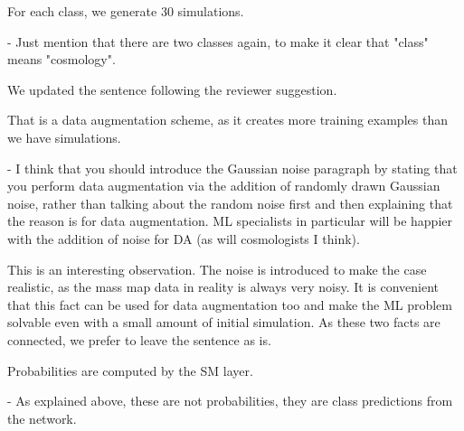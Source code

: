 \documentclass[12pt,a4paper]{article}
\newcommand{\nati}[1]{{\color[rgb]{.1,.6,.1}{NP: #1}}}
\newcommand{\TK}[1]{{\color{red}{TK: #1}}}
\newcommand{\todo}[1]{{\color[rgb]{.6,.1,.6}{TODO: #1}}}
\newcommand{\1}{\b{1}}              %
\newcommand{\0}{\b{0}}              %
\begin{document}
\begin{mdframed}[style=comment]
For each class, we generate 30 simulations.

- Just mention that there are two classes again, to make it clear that "class" means "cosmology".
\end{mdframed}
We updated the sentence following the reviewer suggestion.
\nati{@Tomek, do you think it is fine that we do not say that class==comoslogy? It think so.}

\begin{mdframed}[style=comment]
That is a data augmentation scheme, as it creates more training examples than we have simulations.

- I think that you should introduce the Gaussian noise paragraph by stating that you perform data augmentation via the addition of randomly drawn Gaussian noise, rather than talking about the random noise first and then explaining that the reason is for data augmentation. ML specialists in particular will be happier with the addition of noise for DA (as will cosmologists I think).
\end{mdframed}
\todo{To check: @all}


This is an interesting observation. The noise is introduced to make the case realistic, as the mass map data in reality is always very noisy. It is convenient that this fact can be used for data augmentation too and make the ML problem solvable even with a small amount of initial simulation. As these two facts are connected, we prefer to leave the sentence as is.

\begin{mdframed}[style=comment]
Probabilities are computed by the SM layer.

- As explained above, these are not probabilities, they are class predictions from the network.
\end{mdframed}
\todo{To check: @michael}
\end{document}
